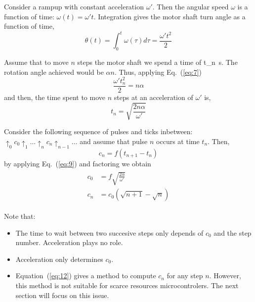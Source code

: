 \documentclass[a4paper]{article}
\newcommand{\vSI}[2]{\SI[math-rm=\ensuremath,parse-numbers=false]{#1}{#2}}
\begin{document}
Consider a rampup with constant acceleration $\omega'$. Then the
angular speed $\omega$ is a function of time: $\omega(t) = \omega'
t$. Integration gives the motor shaft turn angle as a function of
time,
\begin{equation}
  \label{eq:7}
  \theta(t) = \int_0^t \omega(\tau)d\tau = \frac{\omega't^2}{2}  
\end{equation}

Assume that to move $n$ steps the motor shaft we spend a time of
\vSI{t_n}{\second}. The rotation angle achieved would be $\alpha
n$. Thus, applying Eq.~(\ref{eq:7})
\begin{equation}
  \label{eq:8}
  \frac{\omega't_n^2}{2} = n\alpha
\end{equation}
%
%
and then, the time spent to move $n$ steps at an acceleration of
$\omega'$ is,
\begin{equation}
  \label{eq:9}
  t_n = \sqrt{\frac{2n\alpha}{\omega'}}  
\end{equation}

%
%
Consider the following sequence of pulses and ticks inbetween:
$\uparrow_0 c_0 \uparrow_1 \dots \uparrow_n c_n \uparrow_{n-1}\dots$
and assume that pulse $n$ occurs at time $t_n$. Then,
\begin{equation}
  \label{eq:10}
  c_n = f (t_{n+1} - t_n)  
\end{equation}
by applying Eq.~(\ref{eq:9}) and factoring we obtain
\begin{eqnarray}
  \label{eq:12}
  \begin{split}
    c_0 & = f \sqrt{\frac{2\alpha}{\omega'}} \\
    c_n & = c_0 (\sqrt{n+1} - \sqrt{n})
  \end{split}
\end{eqnarray}

Note that:
\begin{itemize}
\item The time to wait between two succesive steps only depends of
  $c_0$ and the step number. Acceleration plays no role.
\item Acceleration only determines $c_0$.
\item Equation~(\ref{eq:12}) gives a method to compute $c_n$ for any
  step $n$. However, this method is not suitable for scarce resources
  microcontrolers. The next section will focus on this issue.
\end{itemize}
\end{document}
